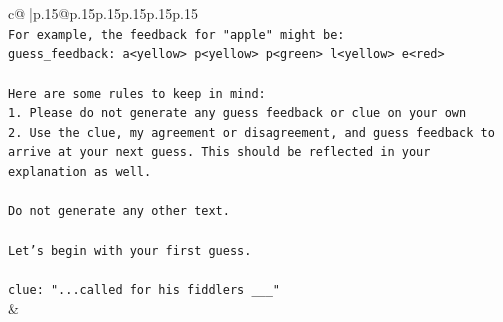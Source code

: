 \documentclass{article}
\begin{document}
{\begin{supertabular}{c@{$\;$}|p{.15\linewidth}@{}p{.15\linewidth}p{.15\linewidth}p{.15\linewidth}p{.15\linewidth}p{.15\linewidth}}
{{{\\ 
\texttt{For example, the feedback for "apple" might be:} \\
\texttt{guess\_feedback: a<yellow> p<yellow> p<green> l<yellow> e<red>} \\
\\ 
\texttt{Here are some rules to keep in mind:} \\
\texttt{1. Please do not generate any guess feedback or clue on your own} \\
\texttt{2. Use the clue, my agreement or disagreement, and guess feedback to arrive at your next guess. This should be reflected in your explanation as well.} \\
\\ 
\texttt{Do not generate any other text.} \\
\\ 
\texttt{Let's begin with your first guess.} \\
\\ 
\texttt{clue: "...called for his fiddlers \_\_\_"} \\
            }
        }
    }
    & \\ \\


\end{supertabular}}
\end{document}
